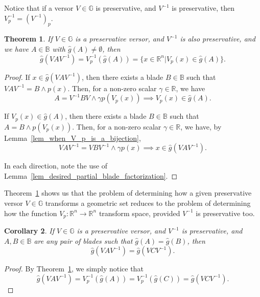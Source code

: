 \documentclass{birkjour}
\newtheorem{thm}{Theorem}[section]
\newtheorem{cor}[thm]{Corollary}
\theoremstyle{definition}
\theoremstyle{remark}
\numberwithin{equation}{section}
\newcommand{\R}{\mathbb{R}}
\newcommand{\B}{\mathbb{B}}
\newcommand{\G}{\mathbb{G}}
\newcommand{\gh}{\hat{g}}
\begin{document}
Notice that if a versor $V\in\G$ is preservative, and $V^{-1}$ is preservative,
then $V_p^{-1}=(V^{-1})_p$.

\begin{thm}\label{thm_how_preservative_versor_transforms}
If $V\in\G$ is a preservative versor, and $V^{-1}$ is also preservative,
and we have $A\in\B$ with $\gh(A)\neq\emptyset$, then
\begin{equation}
\gh(VAV^{-1}) = V_p^{-1}(\gh(A)) = \{x\in\R^n|V_p(x)\in\gh(A)\}.
\end{equation}
\end{thm}
\begin{proof}
If $x\in\gh(VAV^{-1})$, then there exists a blade $B\in\B$
such that $VAV^{-1}=B\wedge p(x)$.  Then, for a non-zero scalar $\gamma\in\R$,
we have
\begin{equation}
A=V^{-1}BV\wedge\gamma p(V_p(x))\implies V_p(x)\in\gh(A).
\end{equation}

If $V_p(x)\in\gh(A)$, then there exists a blade $B\in\B$
such that $A = B\wedge p(V_p(x))$.  Then, for a non-zero scalar $\gamma\in\R$,
we have, by Lemma~\ref{lem_when_V_p_is_a_bijection},
\begin{equation}
VAV^{-1}=VBV^{-1}\wedge\gamma p(x)\implies x\in\gh(VAV^{-1}).
\end{equation}

In each direction, note the use of Lemma~\ref{lem_desired_partial_blade_factorization}.
\end{proof}

Theorem~\ref{thm_how_preservative_versor_transforms} shows us that the
problem of determining how a given preservative
versor $V\in\G$ transforms a geometric set reduces to the problem of determining
how the function $V_p:\R^n\to\R^n$ transform space, provided $V^{-1}$ is preservative too.

\begin{cor}
If $V\in\G$ is a preservative versor, and $V^{-1}$ is preservative, and $A,B\in\B$ are any pair
of blades such that $\gh(A)=\gh(B)$, then
\begin{equation}
\gh(VAV^{-1})=\gh(VCV^{-1}).
\end{equation}
\end{cor}
\begin{proof}
By Theorem~\ref{thm_how_preservative_versor_transforms}, we simply notice that
\begin{equation}
\gh(VAV^{-1})=V_p^{-1}(\gh(A))=V_p^{-1}(\gh(C))=\gh(VCV^{-1}).
\end{equation}
\end{proof}
\end{document}
